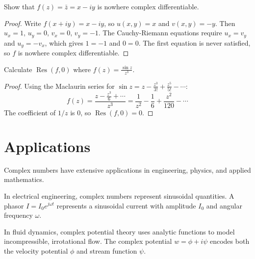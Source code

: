 \begin{exercise}
\label{ex:cauchy-riemann-example}
Show that $f(z) = \bar{z} = x - iy$ is nowhere complex differentiable.

\begin{proof}
Write $f(x + iy) = x - iy$, so $u(x, y) = x$ and $v(x, y) = -y$.
Then $u_x = 1$, $u_y = 0$, $v_x = 0$, $v_y = -1$.
The Cauchy-Riemann equations require $u_x = v_y$ and $u_y = -v_x$, which gives $1 = -1$ and $0 = 0$.
The first equation is never satisfied, so $f$ is nowhere complex differentiable.
\end{proof}
\end{exercise}

\begin{exercise}
\label{ex:residue-example}
Calculate $\operatorname{Res}(f, 0)$ where $f(z) = \frac{\sin z}{z^3}$.

\begin{proof}
Using the Maclaurin series for $\sin z = z - \frac{z^3}{3!} + \frac{z^5}{5!} - \cdots$:
\[ f(z) = \frac{z - \frac{z^3}{6} + \cdots}{z^3} = \frac{1}{z^2} - \frac{1}{6} + \frac{z^2}{120} - \cdots \]
The coefficient of $1/z$ is 0, so $\operatorname{Res}(f, 0) = 0$.
\end{proof}
\end{exercise}

\section{Applications}
\label{sec:complex-applications}

Complex numbers have extensive applications in engineering, physics, and applied mathematics.

\begin{example}
\label{ex:ac-analysis}
In electrical engineering, complex numbers represent sinusoidal quantities. A phasor $I = I_0 e^{j\omega t}$ represents a sinusoidal current with amplitude $I_0$ and angular frequency $\omega$.

\end{example}

\begin{example}
\label{ex:fluid-dynamics}
In fluid dynamics, complex potential theory uses analytic functions to model incompressible, irrotational flow. The complex potential $w = \phi + i\psi$ encodes both the velocity potential $\phi$ and stream function $\psi$.

\end{example}

